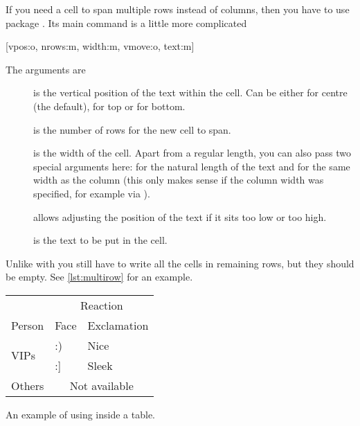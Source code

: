 If you need a cell to span multiple rows instead of columns, then you have to
use package . Its main command is a little more complicated
\begin{lscommand}
  [vpos:o, nrows:m, width:m, vmove:o, text:m]
\end{lscommand}
The arguments are
\begin{description}
  \item[] is the vertical position of the text within the cell.
    Can be either  for centre (the default),  for top or
     for bottom.
  \item[] is the number of rows for the new cell to span.
  \item[] is the width of the cell. Apart from a regular length,
    you can also pass two special arguments here: \cargv{*} for the natural
    length of the text and \cargv{=} for the same width as the column (this
    only makes sense if the column width was specified, for example via
    ).
  \item[] allows adjusting the position of the text if it sits too
    low or too high.
  \item[] is the text to be put in the cell.
\end{description}
Unlike with  you still have to write all the cells in remaining
rows, but they should be empty. See \autoref{lst:multirow} for an example.
\begin{listing}
  \begin{chktexignore}
  \begin{example}[examplewidth=0.85\linewidth, vertical_mode]
\begin{tabular}{@{}lll@{}}
  \toprule
              & \multicolumn{2}{c}{Reaction}      \\
  \cmidrule(l){2-3}
  Person      & Face            & Exclamation     \\
  \midrule
  \multirow[t]{2}{*}{VIPs} & :) & Nice            \\
              & :]              & Sleek           \\
  Others      & \multicolumn{2}{c}{Not available} \\
  \bottomrule
\end{tabular}
\end{example}
\end{chktexignore}
  \caption{An example of using  inside a table.}\label{lst:multirow}
\end{listing}

